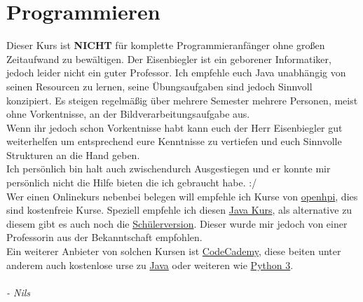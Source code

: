 \chapter{Programmieren}

Dieser Kurs ist \textbf{NICHT} für komplette Programmieranfänger ohne großen Zeitaufwand zu bewältigen. Der Eisenbiegler ist ein geborener Informatiker, jedoch leider nicht ein guter Professor. Ich empfehle euch Java unabhängig von seinen Resourcen zu lernen, seine Übungsaufgaben sind jedoch Sinnvoll konzipiert. Es steigen regelmäßig über mehrere Semester mehrere Personen, meist ohne Vorkentnisse, an der Bildverarbeitungsaufgabe aus.\\
Wenn ihr jedoch schon Vorkentnisse habt kann euch der Herr Eisenbiegler gut weiterhelfen um entsprechend eure Kenntnisse zu vertiefen und euch Sinnvolle Strukturen an die Hand geben.\\
Ich persönlich bin halt auch zwischendurch Ausgestiegen und er konnte mir persönlich nicht die Hilfe bieten die ich gebraucht habe. :/ \\
Wer einen Onlinekurs nebenbei belegen will empfehle ich Kurse von \href{https://open.hpi.de/courses}{openhpi}, dies sind kostenfreie Kurse. Speziell empfehle ich diesen \href{https://open.hpi.de/courses/javaeinstieg2020}{Java Kurs}, als alternative zu diesem gibt es auch noch die  \href{https://open.hpi.de/courses/javaeinstieg-schule2024}{Schülerversion}. Dieser wurde mir jedoch von einer Professorin aus der Bekanntschaft empfohlen. \\ Ein weiterer Anbieter von solchen Kursen ist \href{https://www.codecademy.com/learn/learn-java}{CodeCademy}, diese beiten unter anderem auch kostenlose urse zu \href{https://www.codecademy.com/learn/learn-java}{Java} oder weiteren wie \href{https://www.codecademy.com/learn/learn-python-3}{Python 3}.
\\~\\
\emph{- Nils}

\newpage

\newpage


\newpage

